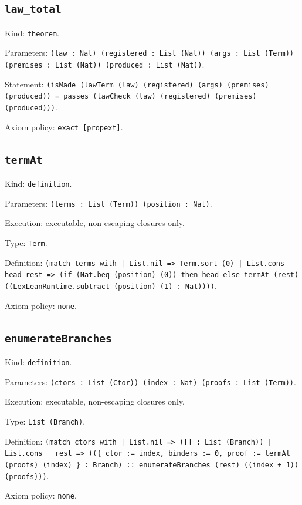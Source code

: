 \documentclass[11pt]{article}
\begin{document}
\subsection*{\texttt{law\_total}}
\noindent Kind: \texttt{theorem}.\par
\noindent Parameters: \texttt{(law : Nat) (registered : List (Nat)) (args : List (Term)) (premises : List (Nat)) (produced : List (Nat))}.\par
\noindent Statement: \texttt{(isMade (lawTerm (law) (registered) (args) (premises) (produced)) = passes (lawCheck (law) (registered) (premises) (produced)))}.\par
\noindent Axiom policy: \texttt{exact [propext]}.\par
\subsection*{\texttt{termAt}}
\noindent Kind: \texttt{definition}.\par
\noindent Parameters: \texttt{(terms : List (Term)) (position : Nat)}.\par
\noindent Execution: executable, non-escaping closures only.\par
\noindent Type: \texttt{Term}.\par
\noindent Definition: \texttt{(match terms with | List.nil => Term.sort (0) | List.cons head rest => (if (Nat.beq (position) (0)) then head else termAt (rest) ((LexLeanRuntime.subtract (position) (1) : Nat))))}.\par
\noindent Axiom policy: \texttt{none}.\par
\subsection*{\texttt{enumerateBranches}}
\noindent Kind: \texttt{definition}.\par
\noindent Parameters: \texttt{(ctors : List (Ctor)) (index : Nat) (proofs : List (Term))}.\par
\noindent Execution: executable, non-escaping closures only.\par
\noindent Type: \texttt{List (Branch)}.\par
\noindent Definition: \texttt{(match ctors with | List.nil => ([] : List (Branch)) | List.cons \_ rest => ((\{ ctor := index, binders := 0, proof := termAt (proofs) (index) \} : Branch) :: enumerateBranches (rest) ((index + 1)) (proofs)))}.\par
\noindent Axiom policy: \texttt{none}.\par
\end{document}
